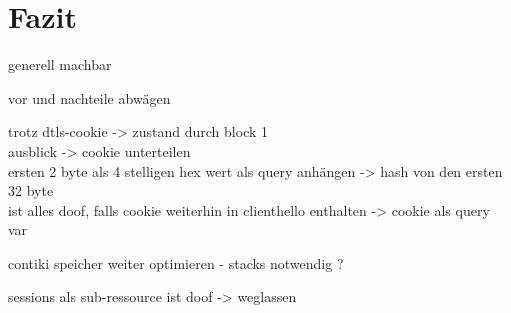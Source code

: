 \chapter{Fazit}

generell machbar

vor und nachteile abwägen

trotz dtls-cookie -> zustand durch block 1\\
ausblick -> cookie unterteilen\\
ersten 2 byte als 4 stelligen hex wert als query anhängen -> hash von den ersten 32 byte\\
ist alles doof, falls cookie weiterhin in clienthello enthalten -> cookie als query var

contiki speicher weiter optimieren - stacks notwendig ?

sessions als sub-ressource ist doof -> weglassen